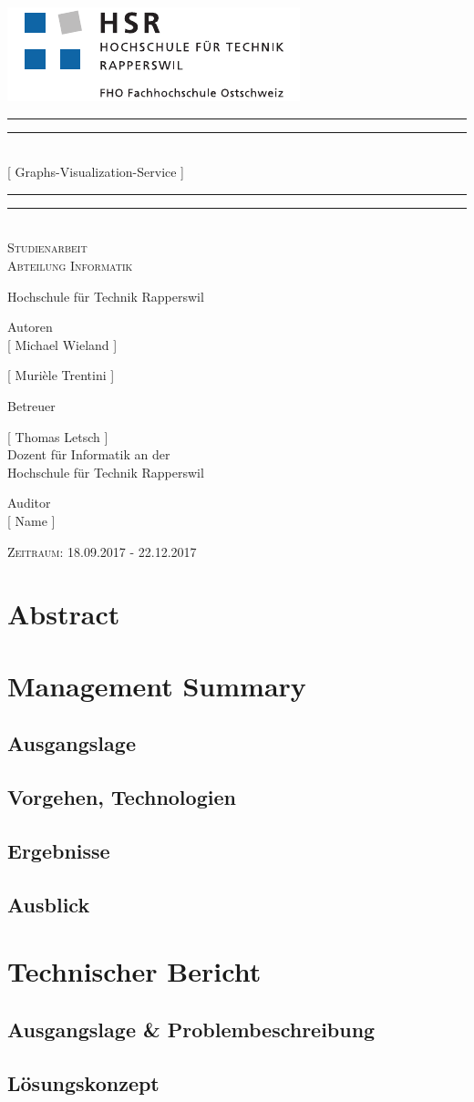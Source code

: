 \documentclass[11pt,a4paper,english,oneside]{book}
\newcommand*{\plogo}{\includegraphics{logo_hsr.pdf}}
\numberwithin{equation}{chapter}
\newcommand*{\titleGP}{\begingroup %
	\centering %
	\vspace*{\baselineskip} %
	\plogo\\[2\baselineskip] %
	\rule{\textwidth}{1.6pt}\vspace*{-\baselineskip}\vspace*{2pt} %
	\rule{\textwidth}{0.4pt}\\[\baselineskip] %
	{\LARGE [ Graphs-Visualization-Service ]}\\[0.2\baselineskip] %
	\rule{\textwidth}{0.4pt}\vspace*{-\baselineskip}\vspace{3.2pt} %
	\rule{\textwidth}{1.6pt}\\[2\baselineskip] %
	\scshape %
	\large Studienarbeit \\[2\baselineskip]
	Abteilung Informatik \par
	Hochschule für Technik Rapperswil
	\vspace*{2\baselineskip}
	
	
	Autoren\\
	{\Large [ Michael Wieland ] \\ [5pt]}
	
	{\Large [ Murièle Trentini ] \\ [5pt]}
	
	\vspace*{2\baselineskip}
	Betreuer\\
	{\Large [ Thomas Letsch ] \\[5pt]
		\small Dozent für Informatik an der \\[5pt]Hochschule für Technik Rapperswil\par}
	\vspace*{2\baselineskip}
	
	Auditor\\
	{\Large [ Name ] \\[5pt]}
	\vspace*{2\baselineskip}
	
	\vfill
	{\scshape Zeitraum: 18.09.2017 - 22.12.2017} \\[0.3\baselineskip]
	\endgroup}
\begin{document}
	\thispagestyle{empty}
	\titleGP
	\newpage
	\doublespacing
	\setcounter{page}{1}
	\section*{Abstract}
	\thispagestyle{firststyle}
	
	
	\newpage
	
	\section*{Management Summary}
	\thispagestyle{firststyle}
	
	\subsection*{Ausgangslage}
	
	\subsection*{Vorgehen, Technologien}
	
	\subsection*{Ergebnisse}
	
	\subsection*{Ausblick}
	
	\newpage
	
	\section*{Technischer Bericht}  %
	\thispagestyle{firststyle}
	
	\subsection*{Ausgangslage \& Problembeschreibung}
	
	
	\subsection*{Lösungskonzept}
	
\end{document}
